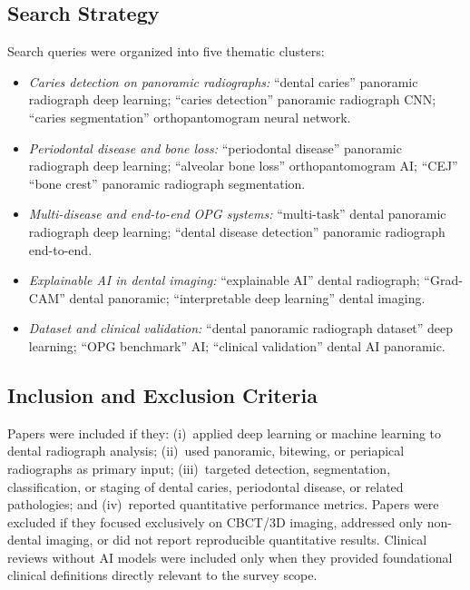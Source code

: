 \documentclass[conference]{IEEEtran}
\begin{document}
\subsection{Search Strategy}

Search queries were organized into five thematic clusters:

\begin{itemize}
  \item \textit{Caries detection on panoramic radiographs:}
        ``dental caries'' panoramic radiograph deep learning; ``caries
        detection'' panoramic radiograph CNN; ``caries segmentation''
        orthopantomogram neural network.

  \item \textit{Periodontal disease and bone loss:} ``periodontal
        disease'' panoramic radiograph deep learning; ``alveolar bone
        loss'' orthopantomogram AI; ``CEJ'' ``bone crest'' panoramic
        radiograph segmentation.

  \item \textit{Multi-disease and end-to-end OPG systems:}
        ``multi-task'' dental panoramic radiograph deep learning;
        ``dental disease detection'' panoramic radiograph end-to-end.

  \item \textit{Explainable AI in dental imaging:} ``explainable AI''
        dental radiograph; ``Grad-CAM'' dental panoramic;
        ``interpretable deep learning'' dental imaging.

  \item \textit{Dataset and clinical validation:} ``dental panoramic
        radiograph dataset'' deep learning; ``OPG benchmark'' AI;
        ``clinical validation'' dental AI panoramic.
\end{itemize}

\subsection{Inclusion and Exclusion Criteria}

Papers were included if they: (i)~applied deep learning or machine
learning to dental radiograph analysis; (ii)~used panoramic, bitewing,
or periapical radiographs as primary input; (iii)~targeted detection,
segmentation, classification, or staging of dental caries, periodontal
disease, or related pathologies; and (iv)~reported quantitative
performance metrics. Papers were excluded if they focused exclusively on
CBCT/3D imaging, addressed only non-dental imaging, or did not report
reproducible quantitative results. Clinical reviews without AI models
were included only when they provided foundational clinical definitions
directly relevant to the survey scope.
\end{document}
